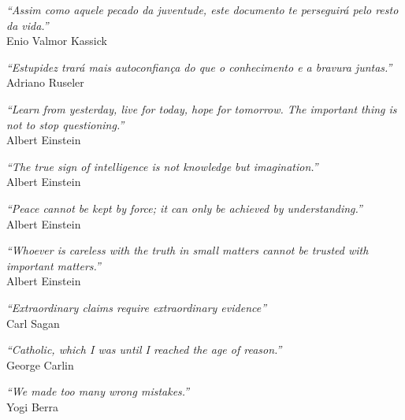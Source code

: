 

\begin{epigrafe}

    \vspace*{\fill}
    \begin{flushright}
        \textit{``Assim como aquele pecado da juventude, este documento te perseguirá pelo resto da vida.''}\\Enio Valmor Kassick
    \end{flushright}
    \begin{flushright}
        \textit{``Estupidez trará mais autoconfiança do que o conhecimento e a bravura juntas.''}\\
        Adriano Ruseler
    \end{flushright}
    \begin{flushright}
        \textit{``Learn from yesterday, live for today, hope for tomorrow. The important thing is not to stop questioning.''}\\ Albert Einstein
    \end{flushright}
    \begin{flushright}
        \textit{``The true sign of intelligence is not knowledge but imagination.''}\\  Albert Einstein
    \end{flushright}
    \begin{flushright}
        \textit{``Peace cannot be kept by force; it can only be achieved by understanding.''}\\ Albert Einstein
    \end{flushright}
    \begin{flushright}
        \textit{``Whoever is careless with the truth in small matters cannot be trusted with important matters.''}\\    Albert Einstein
    \end{flushright}
    \begin{flushright}
        \textit{``Extraordinary claims require extraordinary evidence''}\\
        Carl Sagan
    \end{flushright}
    \begin{flushright}
        \textit{``Catholic, which I was until I reached the age of reason.''}\\
        George Carlin
    \end{flushright}
    \begin{flushright}
        \textit{``We made too many wrong mistakes.''}\\
        Yogi Berra
    \end{flushright}

\end{epigrafe}


